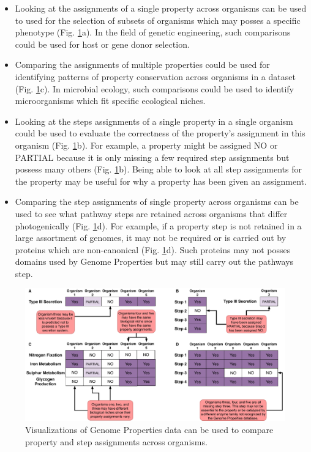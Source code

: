 \begin{itemize}
\item Looking at the assignments of a single property across organisms can be used to used for the selection of subsets of organisms which may posses a specific phenotype (Fig. \ref{fig:client-analysis-types}a). In the field of genetic engineering, such comparisons could be used for host or gene donor selection.
\item Comparing the assignments of multiple properties could be used for identifying patterns of property conservation across organisms in a dataset (Fig. \ref{fig:client-analysis-types}c). In microbial ecology, such comparisons could be used to identify microorganisms which fit specific ecological niches.
\item Looking at the steps assignments of a single property in a single organism could be used to evaluate the correctness of the property's assignment in this organism  (Fig. \ref{fig:client-analysis-types}b). For example, a property might be assigned NO or PARTIAL because it is only missing a few required step assignments but possess many others (Fig. \ref{fig:client-analysis-types}b). Being able to look at all step assignments for the property may be useful for why a property has been given an assignment.
\item Comparing the step assignments of single property across organisms can be used to see what pathway steps are retained across organisms that differ photogenically (Fig. \ref{fig:client-analysis-types}d). For example, if a property step is not retained in a large assortment of genomes, it may not be required or is carried out by proteins which are non-canonical (Fig. \ref{fig:client-analysis-types}d). Such proteins may not posses domains used by Genome Properties but may still carry out the pathways step.
\end{itemize}

\begin{figure}[!ht]
  \centering
	\includegraphics[width=\textwidth]{media/analysis_types.pdf}
	 \caption{Visualizations of Genome Properties data can be used to compare property and step assignments across organisms.}
	 \label{fig:client-analysis-types}
\end{figure}

